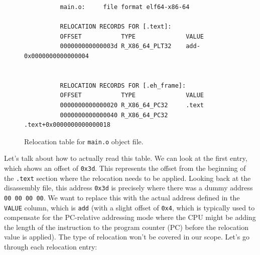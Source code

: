 \documentclass{article}
\begin{document}
      \begin{figure}[H]
        \centering 
        \begin{lstlisting}
          main.o:     file format elf64-x86-64

          RELOCATION RECORDS FOR [.text]:
          OFFSET           TYPE              VALUE 
          000000000000003d R_X86_64_PLT32    add-0x0000000000000004


          RELOCATION RECORDS FOR [.eh_frame]:
          OFFSET           TYPE              VALUE 
          0000000000000020 R_X86_64_PC32     .text
          0000000000000040 R_X86_64_PC32     .text+0x0000000000000018
        \end{lstlisting}
        \caption{Relocation table for \texttt{main.o} object file. } 
        \label{fig:relocation_table}
      \end{figure}

      Let's talk about how to actually read this table. We can look at the first entry, which shows an offset of \texttt{0x3d}. This represents the offset from the beginning of the \texttt{.text} section where the relocation needs to be applied. Looking back at the disassembly file, this address \texttt{0x3d} is precisely where there was a dummy address \texttt{00 00 00 00}. We want to replace this with the actual address defined in the \texttt{VALUE} column, which is \texttt{add} (with a slight offset of \texttt{0x4}, which is typically used to compensate for the PC-relative addressing mode where the CPU might be adding the length of the instruction to the program counter (PC) before the relocation value is applied). The type of relocation won't be covered in our scope. Let's go through each relocation entry: 
\end{document}

